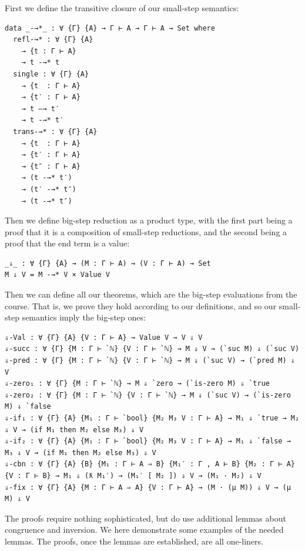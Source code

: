 \documentclass[12pt,a4paper,twoside,openright]{report}
\begin{document}
First we define the transitive closure of our small-step semantics:
\begin{verbatim}
data _-→*_ : ∀ {Γ} {A} → Γ ⊢ A → Γ ⊢ A → Set where
  refl-→* : ∀ {Γ} {A}
    → {t : Γ ⊢ A}
    → t -→* t
  single : ∀ {Γ} {A}
    → {t  : Γ ⊢ A}
    → {t′ : Γ ⊢ A}
    → t —→ t′
    → t -→* t′
  trans-→* : ∀ {Γ} {A}
    → {t  : Γ ⊢ A}
    → {t′ : Γ ⊢ A}
    → {t″ : Γ ⊢ A}
    → (t -→* t′)
    → (t′ -→* t″)
    → (t -→* t″)
\end{verbatim}
Then we define big-step reduction as a product type, with the first part being a proof that it is a composition of small-step reductions, and the second being a proof that the end term is a value:
\begin{verbatim}
_⇓_ : ∀ {Γ} {A} → (M : Γ ⊢ A) → (V : Γ ⊢ A) → Set
M ⇓ V = M -→* V × Value V 
\end{verbatim}
Then we can define all our theorems, which are the big-step evaluations from the course. That is, we prove they hold according to our definitions, and so our small-step semantics imply the big-step ones:
\begin{verbatim}
⇓-Val : ∀ {Γ} {A} {V : Γ ⊢ A} → Value V → V ⇓ V
⇓-succ : ∀ {Γ} {M : Γ ⊢ `ℕ} {V : Γ ⊢ `ℕ} → M ⇓ V → (`suc M) ⇓ (`suc V)
⇓-pred : ∀ {Γ} {M : Γ ⊢ `ℕ} {V : Γ ⊢ `ℕ} → M ⇓ (`suc V) → (`pred M) ⇓ V
⇓-zero₁ : ∀ {Γ} {M : Γ ⊢ `ℕ} → M ⇓ `zero → (`is-zero M) ⇓ `true
⇓-zero₂ : ∀ {Γ} {M : Γ ⊢ `ℕ} {V : Γ ⊢ `ℕ} → M ⇓ (`suc V) → (`is-zero M) ⇓ `false
⇓-if₁ : ∀ {Γ} {A} {M₁ : Γ ⊢ `bool} {M₂ M₃ V : Γ ⊢ A} → M₁ ⇓ `true → M₂ ⇓ V → (if M₁ then M₂ else M₃) ⇓ V
⇓-if₂ : ∀ {Γ} {A} {M₁ : Γ ⊢ `bool} {M₂ M₃ V : Γ ⊢ A} → M₁ ⇓ `false → M₃ ⇓ V → (if M₁ then M₂ else M₃) ⇓ V
⇓-cbn : ∀ {Γ} {A} {B} {M₁ : Γ ⊢ A ⇒ B} {M₁′ : Γ , A ⊢ B} {M₂ : Γ ⊢ A} {V : Γ ⊢ B} → M₁ ⇓ (ƛ M₁′) → (M₁′ [ M₂ ]) ⇓ V → (M₁ · M₂) ⇓ V 
⇓-fix : ∀ {Γ} {A} {M : Γ ⊢ A ⇒ A} {V : Γ ⊢ A} → (M · (μ M)) ⇓ V → (μ M) ⇓ V
\end{verbatim}
The proofs require nothing sophisticated, but do use additional lemmas about congruence and inversion. We here demonstrate some examples of the needed lemmas. The proofs, once the lemmas are established, are all one-liners. 
\end{document}
